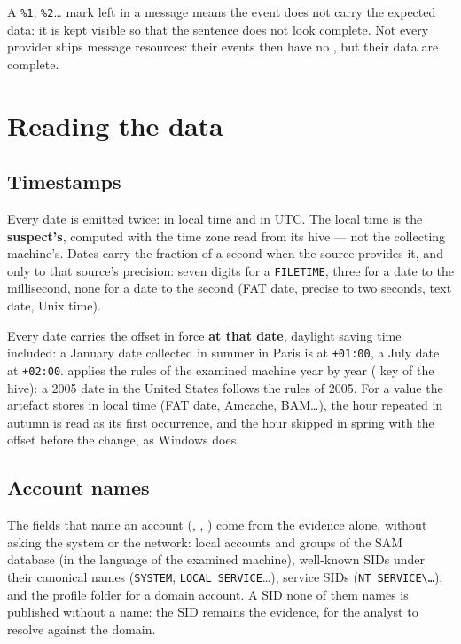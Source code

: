 \documentclass[11pt,a4paper,oneside]{report}
\begin{document}
\begin{note}
A \texttt{\%1}, \texttt{\%2}\ldots{} mark left in a message means the event does
not carry the expected data: it is kept visible so that the sentence does not
look complete. Not every provider ships message resources: their events then
have no , but their data are complete.
\end{note}

\chapter{Reading the data}\label{chap:lecture}

\section{Timestamps}

Every date is emitted twice:  in local time and  in UTC.
The local time is the \textbf{suspect's}, computed with the time zone read from
its  hive — not the collecting machine's. Dates carry the
fraction of a second when the source provides it, and only to that source's
precision: seven digits for a \texttt{FILETIME}, three for a date to the
millisecond, none for a date to the second (FAT date, precise to two seconds,
text date, Unix time).

Every date carries the offset in force \textbf{at that date}, daylight saving
time included: a January date collected in summer in Paris is at
\texttt{+01:00}, a July date at \texttt{+02:00}. \wac{} applies the rules of
the examined machine year by year ( key of the
 hive): a 2005 date in the United States follows the rules
of 2005. For a value the artefact stores in local time (FAT date, Amcache,
BAM…), the hour repeated in autumn is read as its first occurrence, and the
hour skipped in spring with the offset before the change, as Windows does.

\section{Account names}

The fields that name an account (, ,
) come from the evidence alone, without asking the system or
the network: local accounts and groups of the SAM database (in the language
of the examined machine), well-known SIDs under their canonical names
(\texttt{SYSTEM}, \texttt{LOCAL SERVICE}\ldots), service SIDs
(\texttt{NT SERVICE\textbackslash\ldots}), and the profile folder for a
domain account. A SID none of them names is published without a name: the SID
remains the evidence, for the analyst to resolve against the domain.
\end{document}

